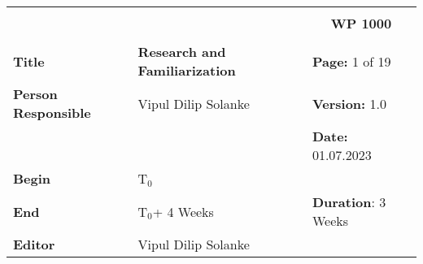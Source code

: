 \begin{table}[!h]
  \begin{center}
    \begin{tabular}{|p{35mm}||p{55mm}|p{50mm}||p{40mm}|}
      \hline
      \multicolumn{3}{|l||}{\textbf{}} & \multicolumn{1}{c|}{}                                                                                                                                                \\
      \multicolumn{3}{|l||}{\textbf{}} & \multicolumn{1}{c|}{\textbf{WP 1000}}                                                                                                                                \\
      \multicolumn{3}{|l||}{\textbf{}} & \multicolumn{1}{c|}{}                                                                                                                                                \\
      \hline\hline
      \textbf{Title}                   & \multicolumn{2}{p{7cm}||}{\textbf{Research and Familiarization}}
                                       & \textbf{Page:} 1 of 19                                                                                                                                              \\
      \hline
      \textbf{Person Responsible}        & \multicolumn{2}{l||}{Vipul Dilip Solanke}                                                                                                   & \textbf{Version:} 1.0   \\
      \hline
      \multicolumn{3}{|l||}{}          & \textbf{Date:} 01.07.2023                                                                                                                                          \\
      \hline\hline
      \textbf{Begin}                  & \multicolumn{2}{l||}{T$_0$}                                                                                                                &                         \\
      \hline
      \textbf{End}                    & \multicolumn{2}{l||}{T$_0$+ 4 Weeks}                                                                                                        & \textbf{Duration}: 3 Weeks \\
      \hline\hline
      \textbf{Editor}              & \multicolumn{3}{l|}{Vipul Dilip Solanke}                                                                                                                              \\

\end{tabular}
\end{center}
\end{table}
